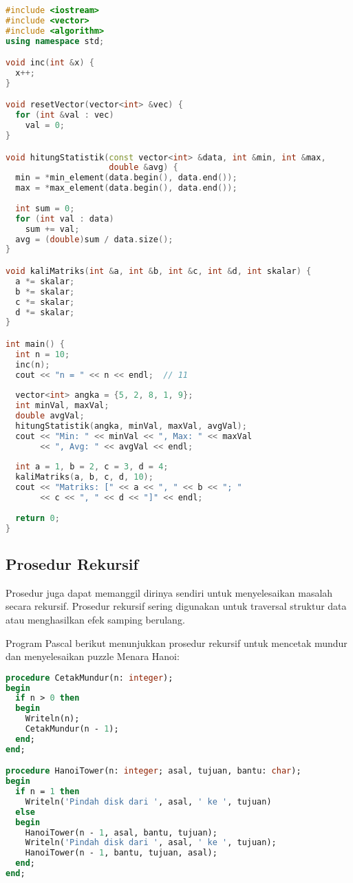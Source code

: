 \documentclass[../main.tex]{subfiles}
\begin{document}
\begin{lstlisting}[language=C++, caption={Pass by reference (C++)}]
#include <iostream>
#include <vector>
#include <algorithm>
using namespace std;

void inc(int &x) {
  x++;
}

void resetVector(vector<int> &vec) {
  for (int &val : vec)
    val = 0;
}

void hitungStatistik(const vector<int> &data, int &min, int &max, 
                     double &avg) {
  min = *min_element(data.begin(), data.end());
  max = *max_element(data.begin(), data.end());
  
  int sum = 0;
  for (int val : data)
    sum += val;
  avg = (double)sum / data.size();
}

void kaliMatriks(int &a, int &b, int &c, int &d, int skalar) {
  a *= skalar;
  b *= skalar;
  c *= skalar;
  d *= skalar;
}

int main() {
  int n = 10;
  inc(n);
  cout << "n = " << n << endl;  // 11
  
  vector<int> angka = {5, 2, 8, 1, 9};
  int minVal, maxVal;
  double avgVal;
  hitungStatistik(angka, minVal, maxVal, avgVal);
  cout << "Min: " << minVal << ", Max: " << maxVal 
       << ", Avg: " << avgVal << endl;
  
  int a = 1, b = 2, c = 3, d = 4;
  kaliMatriks(a, b, c, d, 10);
  cout << "Matriks: [" << a << ", " << b << "; " 
       << c << ", " << d << "]" << endl;
  
  return 0;
}
\end{lstlisting}

\subsection{Prosedur Rekursif}
Prosedur juga dapat memanggil dirinya sendiri untuk menyelesaikan masalah secara rekursif. Prosedur rekursif sering digunakan untuk traversal struktur data atau menghasilkan efek samping berulang.

Program Pascal berikut menunjukkan prosedur rekursif untuk mencetak mundur dan menyelesaikan puzzle Menara Hanoi:

\begin{lstlisting}[language=Pascal, caption={Prosedur rekursif (Pascal)}]
procedure CetakMundur(n: integer);
begin
  if n > 0 then
  begin
    Writeln(n);
    CetakMundur(n - 1);
  end;
end;

procedure HanoiTower(n: integer; asal, tujuan, bantu: char);
begin
  if n = 1 then
    Writeln('Pindah disk dari ', asal, ' ke ', tujuan)
  else
  begin
    HanoiTower(n - 1, asal, bantu, tujuan);
    Writeln('Pindah disk dari ', asal, ' ke ', tujuan);
    HanoiTower(n - 1, bantu, tujuan, asal);
  end;
end;
\end{lstlisting}
\end{document}
